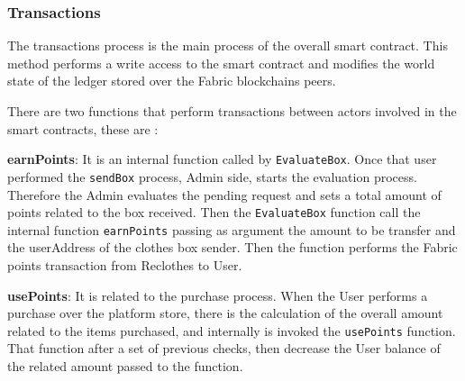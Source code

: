 \subsubsection{Transactions}

The transactions process is the main process of the overall smart contract. This method performs a
write access to the smart contract and modifies  the world state of the ledger stored over the Fabric blockchains peers. 
\bigskip 

There are two functions that perform transactions between actors involved in the smart contracts,
these are :

\begin{outline}[enumerate]
    \1 \textbf{earnPoints}: It is an internal function called by \texttt{EvaluateBox}.
    Once that user performed the \texttt{sendBox} process, Admin side, starts the evaluation process.
    Therefore the Admin evaluates the pending request and sets a total amount of points related to 
    the box received. Then the \texttt{EvaluateBox} function call the internal function \texttt{earnPoints}
    passing as argument the amount to be transfer and the userAddress of the clothes box sender. Then
    the function performs the Fabric points transaction from Reclothes to User.
    
     \1 \textbf{usePoints}: It is related to the purchase process. When the User performs a purchase over
     the platform store, there is the calculation of the overall amount related to the items purchased, and internally
     is invoked the \texttt{usePoints} function. That function after a set of previous checks, then 
     decrease the User balance of the related amount passed to the function.
\end{outline}

